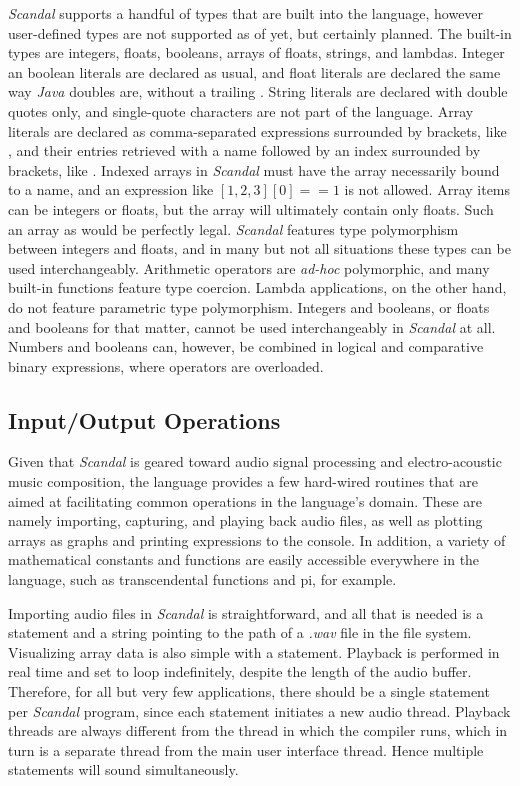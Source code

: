 \emph{Scandal} supports a handful of types that are built into the language, however user-defined types are not supported as of yet, but certainly planned. The built-in types are integers, floats, booleans, arrays of floats, strings, and lambdas. Integer an boolean literals are declared as usual, and float literals are declared the same way \emph{Java} doubles are, without a trailing . String literals are declared with double quotes only, and single-quote characters are not part of the language. Array literals are declared as comma-separated expressions surrounded by brackets, like , and their entries retrieved with a name followed by an index surrounded by brackets, like . Indexed arrays in \emph{Scandal} must have the array necessarily bound to a name, and an expression like $[1, 2, 3][0] == 1$ is not allowed. Array items can be integers or floats, but the array will ultimately contain only floats. Such an array as  would be perfectly legal. \emph{Scandal} features type polymorphism between integers and floats, and in many but not all situations these types can be used interchangeably. Arithmetic operators are \emph{ad-hoc} polymorphic, and many built-in functions feature type coercion. Lambda applications, on the other hand, do not feature parametric type polymorphism. Integers and booleans, or floats and booleans for that matter, cannot be used interchangeably in \emph{Scandal} at all. Numbers and booleans can, however, be combined in logical and comparative binary expressions, where operators are overloaded.

\subsection{Input/Output Operations}

Given that \emph{Scandal} is geared toward audio signal processing and electro-acoustic music composition, the language provides a few hard-wired routines that are aimed at facilitating common operations in the language's domain. These are namely importing, capturing, and playing back audio files, as well as plotting arrays as graphs and printing expressions to the console. In addition, a variety of mathematical constants and functions are easily accessible everywhere in the language, such as transcendental functions and pi, for example.

Importing audio files in \emph{Scandal} is straightforward, and all that is needed is a  statement and a string pointing to the path of a \emph{.wav} file in the file system. Visualizing array data is also simple with a  statement. Playback is performed in real time and set to loop indefinitely, despite the length of the audio buffer. Therefore, for all but very few applications, there should be a single  statement per \emph{Scandal} program, since each  statement initiates a new audio thread. Playback threads are always different from the thread in which the compiler runs, which in turn is a separate thread from the main user interface thread. Hence multiple  statements will sound simultaneously.

